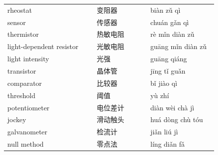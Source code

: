 \documentclass[11pt]{article}
\begin{document}
\begin{longtable}{@{}p{0.40\linewidth}p{0.24\linewidth}p{0.30\linewidth}@{}}
rheostat & 变阻器 & biàn zǔ qì \\
sensor & 传感器 & chuán gǎn qì \\
thermistor & 热敏电阻 & rè mǐn diàn zǔ \\
light-dependent resistor & 光敏电阻 & guāng mǐn diàn zǔ \\
light intensity & 光强 & guāng qiáng \\
transistor & 晶体管 & jīng tǐ guǎn \\
comparator & 比较器 & bǐ jiào qì \\
threshold & 阈值 & yù zhí \\
potentiometer & 电位差计 & diàn wèi chà jì \\
jockey & 滑动触头 & huá dòng chù tóu \\
galvanometer & 检流计 & jiǎn liú jì \\
null method & 零点法 & líng diǎn fǎ \\
\end{longtable}
\end{document}
